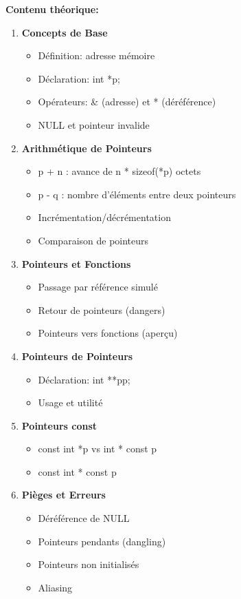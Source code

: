 \documentclass[10pt,a4paper]{article}
\begin{document}
\textbf{Contenu théorique:}
\begin{enumerate}
\item \textbf{Concepts de Base}
   \begin{itemize}
   \item Définition: adresse mémoire
   \item Déclaration: int *p;
   \item Opérateurs: \& (adresse) et * (déréférence)
   \item NULL et pointeur invalide
   \end{itemize}

\item \textbf{Arithmétique de Pointeurs}
   \begin{itemize}
   \item p + n : avance de n * sizeof(*p) octets
   \item p - q : nombre d'éléments entre deux pointeurs
   \item Incrémentation/décrémentation
   \item Comparaison de pointeurs
   \end{itemize}

\item \textbf{Pointeurs et Fonctions}
   \begin{itemize}
   \item Passage par référence simulé
   \item Retour de pointeurs (dangers)
   \item Pointeurs vers fonctions (aperçu)
   \end{itemize}

\item \textbf{Pointeurs de Pointeurs}
   \begin{itemize}
   \item Déclaration: int **pp;
   \item Usage et utilité
   \end{itemize}

\item \textbf{Pointeurs const}
   \begin{itemize}
   \item const int *p vs int * const p
   \item const int * const p
   \end{itemize}

\item \textbf{Pièges et Erreurs}
   \begin{itemize}
   \item Déréférence de NULL
   \item Pointeurs pendants (dangling)
   \item Pointeurs non initialisés
   \item Aliasing
   \end{itemize}
\end{enumerate}
\end{document}
